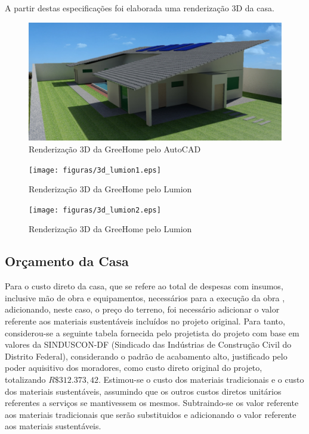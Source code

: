 A partir destas especificações foi elaborada uma renderização 3D da casa.
\newpage

\begin{figure}[H]
  \begin{center}
	\includegraphics[keepaspectratio,scale=0.42,angle=0]{figuras/3d_cad.eps}
	\caption{Renderização 3D da GreeHome pelo AutoCAD}
  \end{center}
\end{figure}

\begin{figure}[H]
  \begin{center}
	\texttt{[image: figuras/3d\_lumion1.eps]}
	\caption{Renderização 3D da GreeHome pelo Lumion}
  \end{center}
\end{figure}

\begin{figure}[H]
  \begin{center}
	\texttt{[image: figuras/3d\_lumion2.eps]}
	\caption{Renderização 3D da GreeHome pelo Lumion}
  \end{center}
\end{figure}

\subsection{Orçamento da Casa}

	Para o custo direto da casa, que se refere ao total de despesas com insumos, inclusive mão de obra e equipamentos, necessários para a execução da obra \cite{IBEC}, adicionando, neste caso, o preço do terreno, foi necessário adicionar o valor referente aos materiais sustentáveis incluídos no projeto original. Para tanto, considerou-se a seguinte tabela fornecida pelo projetista do projeto com base em valores da SINDUSCON-DF (Sindicado das Indústrias de Construção Civil do Distrito Federal), considerando o padrão de acabamento alto, justificado pelo poder aquisitivo dos moradores, como custo direto original do projeto, totalizando $R\$312.373,42$.  Estimou-se o custo dos materiais tradicionais e o custo dos materiais sustentáveis, assumindo que os outros custos diretos unitários referentes a serviços se mantivessem os mesmos. Subtraindo-se os valor referente aos materiais tradicionais que serão substituidos e adicionando o valor referente aos materiais sustentáveis.

